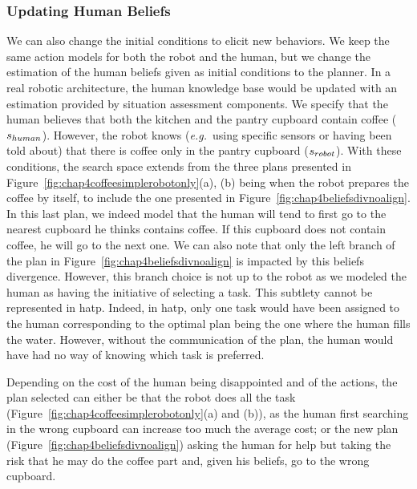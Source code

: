 \documentclass[a4paper,11pt,twoside]{StyleThese}
\begin{document}
\subsubsection{Updating Human Beliefs}
We can also change the initial conditions to elicit new behaviors. We keep the same action models for both the robot and the human, but we change the estimation of the human beliefs given as initial conditions to the planner. In a real robotic architecture, the human knowledge base would be updated with an estimation provided by situation assessment components. We specify that the human believes that both the kitchen and the pantry cupboard contain coffee ($s_{human}$). However, the robot knows (\textit{e.g.}~using specific sensors or having been told about) that there is coffee only in the pantry cupboard ($s_{robot}$). With these conditions, the search space extends from the three plans presented in Figure~\ref{fig:chap4coffeesimplerobotonly}(a), (b) being when the robot prepares the coffee by itself, to include the one presented in Figure~\ref{fig:chap4beliefsdivnoalign}. In this last plan, we indeed model that the human will tend to first go to the nearest cupboard he thinks contains coffee. If this cupboard does not contain coffee, he will go to the next one. We can also note that only the left branch of the plan in Figure~\ref{fig:chap4beliefsdivnoalign} is impacted by this beliefs divergence. However, this branch choice is not up to the robot as we modeled the human as having the initiative of selecting a task. This subtlety cannot be represented in \acrshort{hatp}. Indeed, in \acrshort{hatp}, only one task would have been assigned to the human corresponding to the optimal plan being the one where the human fills the water. However, without the communication of the plan, the human would have had no way of knowing which task is preferred.

Depending on the cost of the human being disappointed and of the actions, the plan selected can either be that the robot does all the task (Figure~\ref{fig:chap4coffeesimplerobotonly}(a) and (b)), as the human first searching in the wrong cupboard can increase too much the average cost; or the new plan (Figure~\ref{fig:chap4beliefsdivnoalign}) asking the human for help but taking the risk that he may do the coffee part and, given his beliefs, go to the wrong cupboard.
\end{document}
